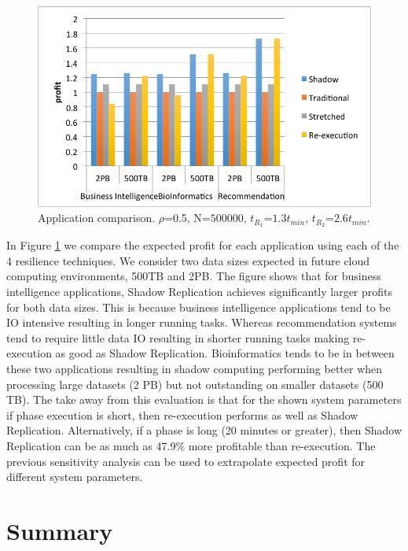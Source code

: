 \begin{figure}[!h]
	
	\begin{center}
	\includegraphics[width=\columnwidth]{figures/application_comparison.png}
	\end{center}
	\caption{Application comparison. $\rho$=0.5, N=$500000$, $t_{R_1}$=$1.3t_{min}$, $t_{R_2}$=$2.6t_{min}$.}
	\label{fig:app_compare}
\end{figure}


In Figure \ref{fig:app_compare} we compare the expected
profit for each application using each of the 4 resilience techniques. 
We consider two data sizes expected in future
cloud computing environments, 500TB and 2PB. The figure shows that
for business intelligence applications, Shadow Replication achieves significantly larger profits for both data sizes. This
is because business intelligence applications tend to be IO intensive
resulting in longer running tasks. Whereas recommendation systems tend
to require little data IO resulting in shorter running tasks making
re-execution as good as Shadow Replication. Bioinformatics tends to be in between
these two applications resulting in shadow computing performing better
when processing large datasets (2 PB) but not outstanding on smaller
datasets (500 TB). The take away from this evaluation is that for the
shown system parameters if phase execution is short, then re-execution
performs as well as Shadow Replication. Alternatively, if a phase is long (20 minutes or
greater), then Shadow Replication can be as much as 47.9\% more
profitable than re-execution. The previous sensitivity analysis can be
used to extrapolate expected profit for different system parameters.

\section{Summary}

